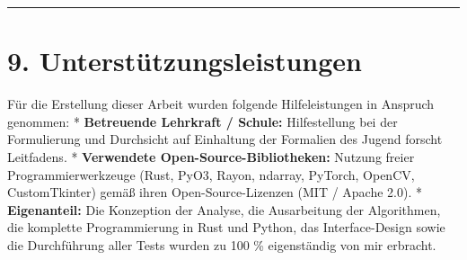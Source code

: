 \documentclass[
  11pt,
]{article}
\begin{document}
\begin{center}\rule{0.5\linewidth}{0.5pt}\end{center}

\section{9. Unterstützungsleistungen}\label{unterstuxfctzungsleistungen}

Für die Erstellung dieser Arbeit wurden folgende Hilfeleistungen in
Anspruch genommen: * \textbf{Betreuende Lehrkraft / Schule:}
Hilfestellung bei der Formulierung und Durchsicht auf Einhaltung der
Formalien des Jugend forscht Leitfadens. * \textbf{Verwendete
Open-Source-Bibliotheken:} Nutzung freier Programmierwerkzeuge (Rust,
PyO3, Rayon, ndarray, PyTorch, OpenCV, CustomTkinter) gemäß ihren
Open-Source-Lizenzen (MIT / Apache 2.0). * \textbf{Eigenanteil:} Die
Konzeption der Analyse, die Ausarbeitung der Algorithmen, die komplette
Programmierung in Rust und Python, das Interface-Design sowie die
Durchführung aller Tests wurden zu 100 \% eigenständig von mir erbracht.
\end{document}
